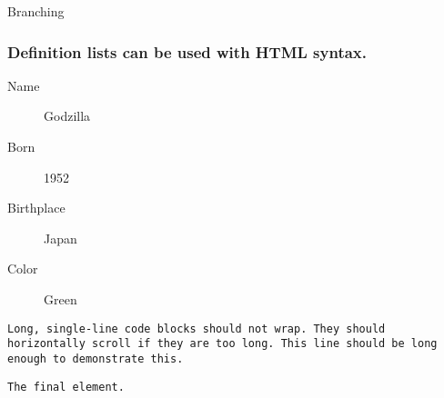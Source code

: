 \documentclass[11pt]{article}
\begin{document}
Branching

\subsubsection*{Definition lists can be used with HTML syntax.}
\label{sec:org0c211c0}

\begin{description}
\item[{Name}] Godzilla
\item[{Born}] 1952
\item[{Birthplace}] Japan
\item[{Color}] Green
\end{description}

\begin{verbatim}
Long, single-line code blocks should not wrap. They should horizontally scroll if they are too long. This line should be long enough to demonstrate this.
\end{verbatim}


\begin{verbatim}
The final element.
\end{verbatim}
\end{document}
